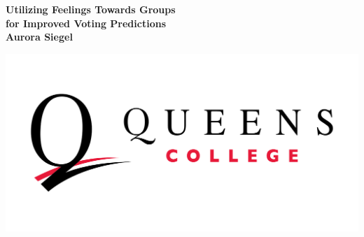 \documentclass[a0,portrait]{a0poster}
\begin{document}
\begin{minipage}[b]{0.7\linewidth}
\VeryHuge
\textbf{Utilizing Feelings Towards Groups \\ for Improved Voting Predictions} \\[0.5cm]
\huge
\color{Magenta}
\textbf{Aurora Siegel}
\color{Black}
\end{minipage}
\begin{minipage}[b]{0.3\linewidth}
  \includegraphics[width=20cm]{queens_college.png}
\end{minipage}
\vspace{0.5cm}
\end{document}
